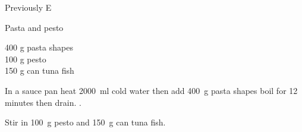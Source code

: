 \begin{menu}{Previously E}
    \begin{recipe}{1}{Pasta and pesto}%
    
		\begin{ingredients}
		400 g pasta shapes  \\
	100 g pesto  \\
	150 g can tuna fish  \\
	
		\end{ingredients}
	
    \begin{instructions}
    \item 
      In a sauce pan heat
      2000~ml  cold water then add
      400~g  pasta shapes
      boil for 12
      minutes then drain.
    .
      \item 
        Stir in
        100~g  pesto and
        150~g  can tuna fish.
      
    \end{instructions}
    \end{recipe}%
  
    \clearpage
    \end{menu}
	
